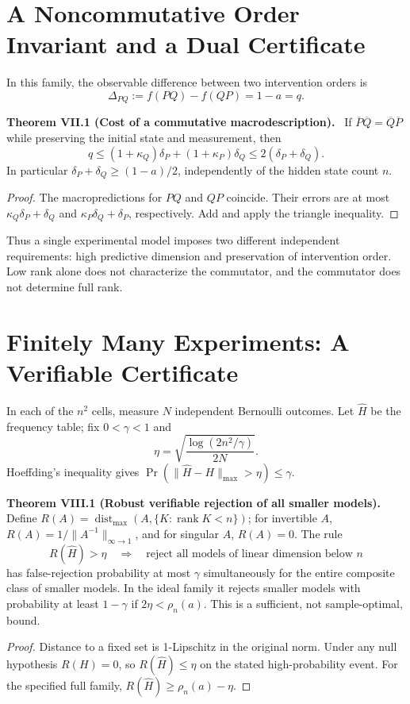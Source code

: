 \documentclass[11pt,a4paper,oneside]{book}
\DeclareMathOperator{\rank}{rank}\DeclareMathOperator{\Tr}{Tr}
\newcommand{\statement}[3]{\par\medskip\noindent\textbf{#1 #2 (#3).}\ }
\begin{document}
\chapter{A Noncommutative Order Invariant and a Dual Certificate}
In this family, the observable difference between two intervention orders is
\begin{equation}\Delta_{PQ}:=f(PQ)-f(QP)=1-a=q.\tag{46}\end{equation}
\statement{Theorem}{VII.1}{Cost of a commutative macrodescription} If $\overline P\overline Q=\overline Q\overline P$ while preserving the initial state and measurement, then
\[q\le(1+\kappa_Q)\delta_P+(1+\kappa_P)\delta_Q\le2(\delta_P+\delta_Q).\]
In particular $\delta_P+\delta_Q\ge(1-a)/2$, independently of the hidden state count $n$.
\begin{proof}The macropredictions for $PQ$ and $QP$ coincide. Their errors are at most $\kappa_Q\delta_P+\delta_Q$ and $\kappa_P\delta_Q+\delta_P$, respectively. Add and apply the triangle inequality.\end{proof}
Thus a single experimental model imposes two different independent requirements: high predictive dimension and preservation of intervention order. Low rank alone does not characterize the commutator, and the commutator does not determine full rank.
\chapter{Finitely Many Experiments: A Verifiable Certificate}
In each of the $n^2$ cells, measure $N$ independent Bernoulli outcomes. Let $\widehat H$ be the frequency table; fix $0<\gamma<1$ and
\[\eta=\sqrt{\frac{\log(2n^2/\gamma)}{2N}}.\]
Hoeffding's inequality gives $\Pr(\|\widehat H-H\|_{\max}>\eta)\le\gamma$.
\statement{Theorem}{VIII.1}{Robust verifiable rejection of all smaller models} Define $R(A)=\operatorname{dist}_{\max}(A,\{K:\rank K<n\})$; for invertible $A$, $R(A)=1/\|A^{-1}\|_{\infty\to1}$, and for singular $A$, $R(A)=0$. The rule
\[R(\widehat H)>\eta\quad\Longrightarrow\quad\text{reject all models of linear dimension below }n\]
has false-rejection probability at most $\gamma$ simultaneously for the entire composite class of smaller models. In the ideal family it rejects smaller models with probability at least $1-\gamma$ if $2\eta<\rho_n(a)$. This is a sufficient, not sample-optimal, bound.
\begin{proof}Distance to a fixed set is 1-Lipschitz in the original norm. Under any null hypothesis $R(H)=0$, so $R(\widehat H)\le\eta$ on the stated high-probability event. For the specified full family, $R(\widehat H)\ge\rho_n(a)-\eta$.\end{proof}
\end{document}
